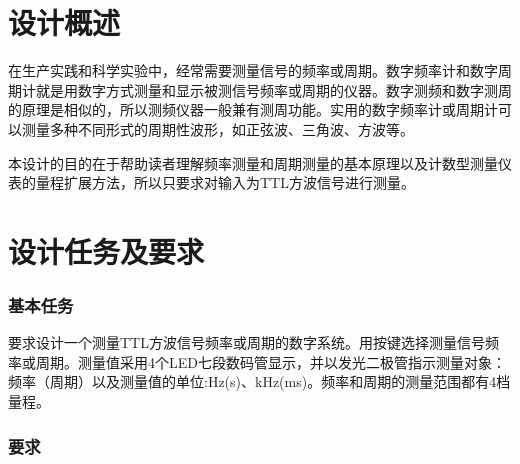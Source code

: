 \documentclass[12pt]{article}
\begin{document}
\newpage
\tableofcontents

\section{设计概述}

在生产实践和科学实验中，经常需要测量信号的频率或周期。数字频率计和数字周期计就是用数字方式测量和显示被测信号频率或周期的仪器。数字测频和数字测周的原理是相似的，所以测频仪器一般兼有测周功能。实用的数字频率计或周期计可以测量多种不同形式的周期性波形，如正弦波、三角波、方波等。

本设计的目的在于帮助读者理解频率测量和周期测量的基本原理以及计数型测量仪表的量程扩展方法，所以只要求对输入为TTL方波信号进行测量。

\section{设计任务及要求}

\subsubsection*{基本任务}

要求设计一个测量TTL方波信号频率或周期的数字系统。用按键选择测量信号频率或周期。测量值采用4个LED七段数码管显示，并以发光二极管指示测量对象：频率（周期）以及测量值的单位:Hz(s)、kHz(ms)。频率和周期的测量范围都有4档量程。

\subsubsection*{要求}
\end{document}
